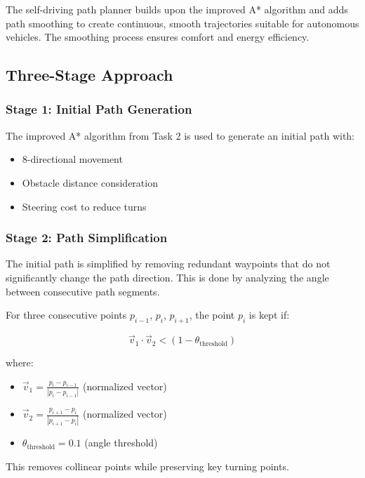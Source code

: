\documentclass[aps,letterpaper,10pt]{revtex4}
\begin{document}
The self-driving path planner builds upon the improved A* algorithm and adds path smoothing to create continuous, smooth trajectories suitable for autonomous vehicles. The smoothing process ensures comfort and energy efficiency.

\subsection{Three-Stage Approach}

\subsubsection{Stage 1: Initial Path Generation}

The improved A* algorithm from Task 2 is used to generate an initial path with:
\begin{itemize}
    \item 8-directional movement
    \item Obstacle distance consideration
    \item Steering cost to reduce turns
\end{itemize}

\subsubsection{Stage 2: Path Simplification}

The initial path is simplified by removing redundant waypoints that do not significantly change the path direction. This is done by analyzing the angle between consecutive path segments.

For three consecutive points $p_{i-1}$, $p_i$, $p_{i+1}$, the point $p_i$ is kept if:

\begin{equation}
\vec{v}_1 \cdot \vec{v}_2 < (1 - \theta_{\text{threshold}})
\end{equation}

where:
\begin{itemize}
    \item $\vec{v}_1 = \frac{p_i - p_{i-1}}{|p_i - p_{i-1}|}$ (normalized vector)
    \item $\vec{v}_2 = \frac{p_{i+1} - p_i}{|p_{i+1} - p_i|}$ (normalized vector)
    \item $\theta_{\text{threshold}} = 0.1$ (angle threshold)
\end{itemize}

This removes collinear points while preserving key turning points.
\end{document}
